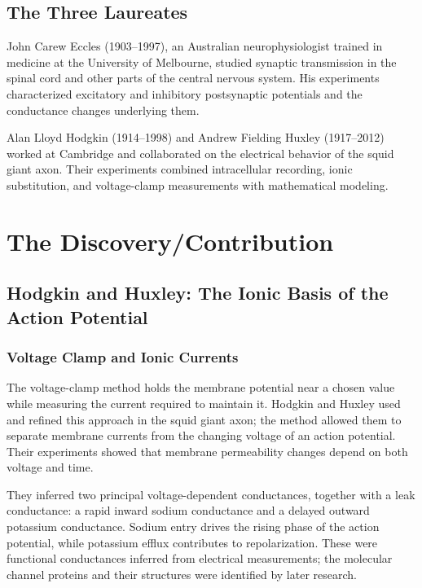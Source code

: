 \subsection{The Three Laureates}

John Carew Eccles (1903--1997), an Australian neurophysiologist trained in medicine at the University of Melbourne, studied synaptic transmission in the spinal cord and other parts of the central nervous system. His experiments characterized excitatory and inhibitory postsynaptic potentials and the conductance changes underlying them.

Alan Lloyd Hodgkin (1914--1998) and Andrew Fielding Huxley (1917--2012) worked at Cambridge and collaborated on the electrical behavior of the squid giant axon. Their experiments combined intracellular recording, ionic substitution, and voltage-clamp measurements with mathematical modeling.

\section{The Discovery/Contribution}

\subsection{Hodgkin and Huxley: The Ionic Basis of the Action Potential}

\subsubsection{Voltage Clamp and Ionic Currents}

The voltage-clamp method holds the membrane potential near a chosen value while measuring the current required to maintain it. Hodgkin and Huxley used and refined this approach in the squid giant axon; the method allowed them to separate membrane currents from the changing voltage of an action potential. Their experiments showed that membrane permeability changes depend on both voltage and time.

They inferred two principal voltage-dependent conductances, together with a leak conductance: a rapid inward sodium conductance and a delayed outward potassium conductance. Sodium entry drives the rising phase of the action potential, while potassium efflux contributes to repolarization. These were functional conductances inferred from electrical measurements; the molecular channel proteins and their structures were identified by later research.


